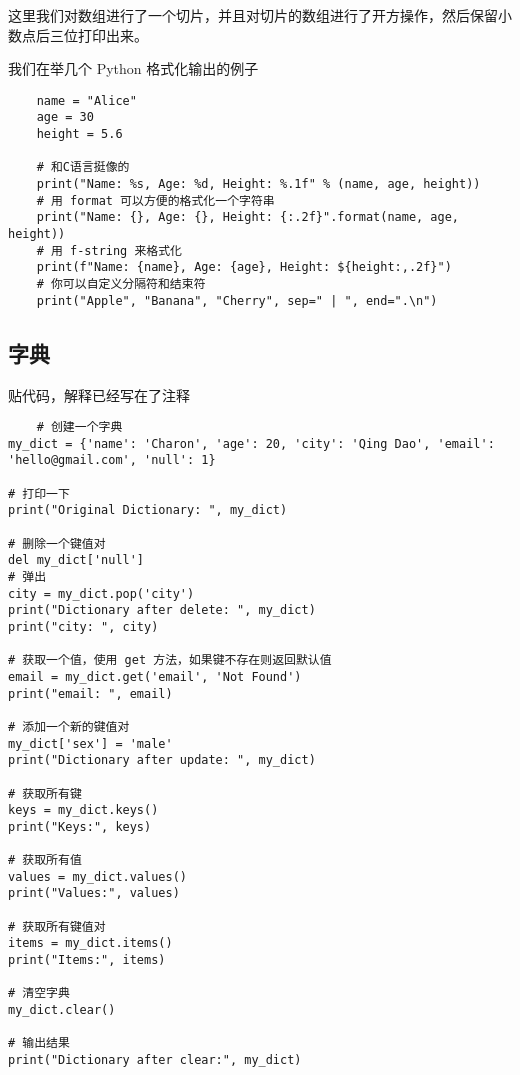             这里我们对数组进行了一个切片，并且对切片的数组进行了开方操作，然后保留小数点后三位打印出来。

            \newpage
            我们在举几个 Python 格式化输出的例子

            \begin{verbatim}
    name = "Alice"
    age = 30
    height = 5.6

    # 和C语言挺像的
    print("Name: %s, Age: %d, Height: %.1f" % (name, age, height))
    # 用 format 可以方便的格式化一个字符串
    print("Name: {}, Age: {}, Height: {:.2f}".format(name, age, height))
    # 用 f-string 来格式化
    print(f"Name: {name}, Age: {age}, Height: ${height:,.2f}")
    # 你可以自定义分隔符和结束符
    print("Apple", "Banana", "Cherry", sep=" | ", end=".\n")
            \end{verbatim}

        \subsection{字典}\label{subsec:3}
            贴代码，解释已经写在了注释
            \begin{verbatim}
    # 创建一个字典
my_dict = {'name': 'Charon', 'age': 20, 'city': 'Qing Dao', 'email': 'hello@gmail.com', 'null': 1}

# 打印一下
print("Original Dictionary: ", my_dict)

# 删除一个键值对
del my_dict['null']
# 弹出
city = my_dict.pop('city')
print("Dictionary after delete: ", my_dict)
print("city: ", city)

# 获取一个值，使用 get 方法，如果键不存在则返回默认值
email = my_dict.get('email', 'Not Found')
print("email: ", email)

# 添加一个新的键值对
my_dict['sex'] = 'male'
print("Dictionary after update: ", my_dict)

# 获取所有键
keys = my_dict.keys()
print("Keys:", keys)

# 获取所有值
values = my_dict.values()
print("Values:", values)

# 获取所有键值对
items = my_dict.items()
print("Items:", items)

# 清空字典
my_dict.clear()

# 输出结果
print("Dictionary after clear:", my_dict)
            \end{verbatim}

